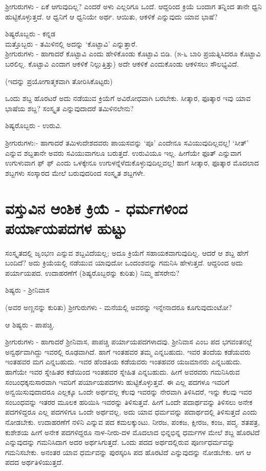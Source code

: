 ಶ್ರೀಗುರುಗಳು - ಏಕೆ ಆಗುವುದಿಲ್ಲ? ಎಂದರೆ ಅಳು ಎಲ್ಲರಿಗೂ ಒಂದೆ. ಆದ್ದರಿಂದ ಕ್ರಿಯೆ ಬಂದಾಗ ತನ್ನಿಂದ ತಾನೇ ಧ್ವನಿ ಹುಟ್ಟಿಕೊಳ್ಳುತ್ತದೆ. ಆ ಧ್ವನಿಗೆ ಆ ಧ್ವನಿಯೇ ಅರ್ಥ. ಆಯಿತು, ಆಕಳಿಕೆ ಎನ್ನುವುದು ಯಾವ ಭಾಷೆ?

ಶಿಷ್ಯರೊಬ್ಬರು - ಕನ್ನಡ\\
ಮತ್ತೊಬ್ಬರು - ತಮಿಳಿನಲ್ಲಿ ಅದನ್ನು `ಕೊಟ್ಟಾವಿ' ಎನ್ನುತ್ತಾರೆ.\\
ಶ್ರೀಗುರುಗಳು - ಹಾಗಾದರೆ ಕೊಟ್ಟಾವಿ ಎಂದು ಹೇಳಿಕೊಂಡು ಕೊಟ್ಟಾವಿ ಬಿಡಿ. (೫-೬ ಬಾರಿ ಪ್ರಯತ್ನಿಸಿದರೂ ಕೊಟ್ಟಾವಿ ಬರಲಿಲ್ಲ. ಕೊಟ್ಟಾವಿ ಎಂದಾಗ ಆಕಳಿಕೆ ನಿಲ್ಲುತ್ತಿತ್ತು) ಅದೇ ಆಕಳಿಕೆ ಎಂದುಕೊಂಡು ಆಕಳಿಸಲು ಸೌಲಭ್ಯವಿದೆ.

(ಇದನ್ನು ಪ್ರಯೋಗಾತ್ಮಕವಾಗಿ ತೋರಿಸಿಕೊಟ್ಟರು)

ಒಂದು ಶಬ್ದ ಹೊರಟರೆ ಅದು ನಡೆಯುವ ಕ್ರಿಯೆಗೆ ಅವಿರೋಧವಾಗಿ ಬರಬೇಕು. ಸೀತ್ಕಾರ, ಫೂತ್ಕಾರ ಇವು ಯಾವ ಭಾಷೆಯ ಶಬ್ದ? ಸಂಸ್ಕೃತ  ಎನ್ನುವುದಾದರೆ ತಮಿಳಿನಲೇನು?

ಶಿಷ್ಯರೊಬ್ಬರು - ಉರುವಿ.

ಶ್ರೀಗುರುಗಳು:- ಹಾಗಾದರೆ ತಮಿಳುದೇಶದವರು ಪಾಯಸವನ್ನು `ಪೂ' ಎಂದೇನೂ ಸವಿಯುವುದಿಲ್ಲವಲ್ಲ! `ಸೀತ್' ಎನ್ನುವ ಶಬ್ದತಾನೇ ಅವರು ಸವಿಯುವಾಗಲೂ ಬರುತ್ತದೆ. ಉರುವಿಯೂ ಇಲ್ಲ. ಹೀಗೆಯೇ ಫೂತ್ ಎನ್ನುವಾಗ ಉಗುಳುವಾಗ ಫ್ ಫ್ ಎಂದು ಒಳಕ್ಕೇನೂ ಉಗುಳನ್ನೆಳೆದುಕೊಳ್ಳುವುದಿಲ್ಲವಲ್ಲ! ಹಾಗೆ ಸೀತ್ಕಾರ, ಫೂತ್ಕಾರ ಮೊದಲಾದ ಶಬ್ದಗಳು ಸಂಸ್ಕಾರದ ಮೇಲೆ ಬರುವುದರಿಂದ ಸಂಸ್ಕೃತ ಶಬ್ದಗಳೇ. 

\section*{ವಸ್ತುವಿನ ಆಂಶಿಕ ಕ್ರಿಯೆ - ಧರ್ಮಗಳಿಂದ ಪರ್ಯಾಯಪದಗಳ ಹುಟ್ಟು }

ಸಂಸ್ಕೃತದಲ್ಲಿ ಜೃಂಭಣ ಎನ್ನುವ ಶಬ್ದವಿದೆಯಲ್ಲ; ಅದೂ ಕ್ರಿಯೆಗೆ ಸಹಾಯಕವಾಗುವುದಿಲ್ಲ. ಆದರೆ ಆ ಶಬ್ದ ಹೇಗೆ ಬಂದಿದೆ? ಅದು ಕ್ರಿಯೆಯಲ್ಲಿ ನಡೆಯುವ ಯಾವುದೋ ಒಂದಂಶವನ್ನು ಗಮನಿಸಿ ಹೇಳುತ್ತದೆ. ಆದ್ದರಿಂದ ಅದು ಪರ್ಯಾಯಪದ. ಉದಾಹರಣೆಗೆ (ಶಿಷ್ಯರೊಬ್ಬರನ್ನು ಕುರಿತು) ನಿಮ್ಮ ಹೆಸರೇನು? 

ಶಿಷ್ಯರು - ಶ್ರೀನಿವಾಸ 

(ಅವರ ಅಣ್ಣನನ್ನು ಕುರಿತು) ಶ್ರೀಗುರುಗಳು - ಮನೆಯಲ್ಲಿ ಅವರನ್ನು ಇನ್ನೇನಾದರೂ ಕೂಗುವುದುಂಟೋ?

ಆ ಶಿಷ್ಯರು - ಪಾಪಚ್ಚಿ.

ಶ್ರೀಗುರುಗಳು - ಹಾಗಾದರೆ ಶ್ರೀನಿವಾಸ, ಪಾಪಚ್ಚಿ ಪರ್ಯಾಯಪದಗಳಾದವು. ಶ್ರೀನಿವಾಸ ಎಂಬ ಪದ ಭಗವಂತನಲ್ಲೆ ಅನ್ವರ್ಥವಾಗಿದ್ದು ಇವರಲ್ಲಿ ರೂಢವಾಗಿದೆ. ಹಾಗೆ ಇಂತಹವರ ತಮ್ಮ ಎನ್ನಬಹುದು. ಇವರ ತಂದೆಯ ಕಡೆಯವರು ಇಂತಹವರ ಮಗ ಎನ್ನಬಹುದು. ಇವರ ಹೆಂಡತಿಯ ಕಡೆಯವರು ಇಂತಹವರ ಯಜಮಾನರು ಎನ್ನಬಹುದು. ಹಾಗೆಯೇ ಇವರ ಸ್ನೇಹಿತರ ಕಡೆಯಿಂದ ಇಂತಹವರ ಸ್ನೇಹಿತ ಎನ್ನಬಹುದು. ಹೀಗೆ ಅವರವರು ಗಮನಿಸಿರುವ ಸಂಬಂಧಕ್ಕನುಸಾರವಾಗಿ ಇವರಿಗೆ ಪರ್ಯಾಯಪದಗಳು ಹುಟ್ಟಿಕೊಳ್ಳುತ್ತವೆ. ಈ ಎಲ್ಲ ಪದಗಳೂ ಇವರಿಗೆ ಅನ್ವಯಿಸುವುದಾದರೂ ಎಲ್ಲಕ್ಕೂ ಒಂದೇ ಅರ್ಥವಲ್ಲ ಕೆಲವು ಇವರನ್ನು ನೇರವಾಗಿ ತಿಳಿಸಿದರೆ, ಇನ್ನು ಕೆಲವು ಇವರ ಸಂಬಂಧವನ್ನು ಇತರರ ಮೂಲಕ ಹರಿಯಿಸಿ ಇವರನ್ನು ತಿಳಿಸುತ್ತವೆ. ಹೀಗೆ ಒಂದೇ ಪದಾರ್ಥವನ್ನು ತಿಳಿಸಲು ಅನೇಕ ಪದಗಳಿದ್ದರೂ ಎಲ್ಲ ಪದಗಳಿಗೂ ಒಂದೇ ಅರ್ಥವಲ್ಲ. ಅದು ಯಾವ ಧರ್ಮವನ್ನು ಪದಾರ್ಥದಲ್ಲಿ ತಿಳಿಸುತ್ತದೆ ಎಂದು ನೋಡಬೇಕು. ಉದಾಹರಣೆಗೆ ನಳಿನಿ ಎನ್ನುವ ಪದ ಕಮಲಕ್ಕುಂಟು. ನೀರಜ, ಪಂಕಜ, ಕ್ಷೀರಜ, ಕಂಜ, ಪದ್ಮ. ಶತಪತ್ರ, ಕುಶೇಶಯ ಹೀಗೆ ಅನೇಕ ಪದಗಳಿದ್ದರೂ ನಾಳ-ನೀರು-ದಳ ಮೊದಲಾದ ಭಿನ್ನಭಿನ್ನ ಧರ್ಮಗಳ ಮೇಲೆ ಶಬ್ದ ಹೊರಟಿದೆ ಎನ್ನುವುದನ್ನು ಗಮನಿಸಿದಾಗ ಅದರ ಅರ್ಥಸಿಗುತ್ತದೆ. ಒಂದು ಪದದ ಅರ್ಥದಲ್ಲಿರುವ ಪೂರ್ಣಧರ್ಮವನ್ನು ಗಮನಿಸಬೇಕು. ಅನಂತರ ಯಾವ ಧರ್ಮವನ್ನು ಪುರಸ್ಕರಿಸಿ ಪದ ಹೊರಟಿದೆ ಎನ್ನುವುದನ್ನು ನೋಡಬೇಕು. ಆಗ ಆ ಪದದ ಅರ್ಥತಿಳಿಯುತ್ತದೆ.

